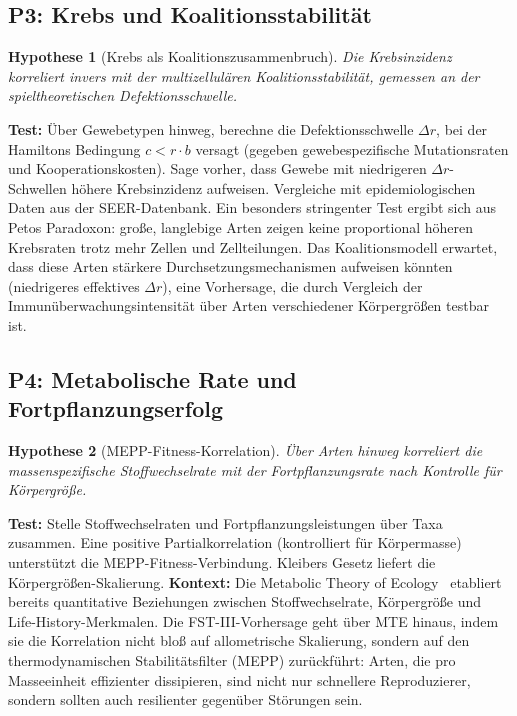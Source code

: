 \documentclass[12pt,a4paper]{article}
\newtheorem{hypothesis}{Hypothese}
\theoremstyle{remark}
\begin{document}
\subsection{P3: Krebs und Koalitionsstabilität}

\begin{hypothesis}[Krebs als Koalitionszusammenbruch]
Die Krebsinzidenz korreliert invers mit der multizellulären Koalitionsstabilität, gemessen an der spieltheoretischen Defektionsschwelle.
\end{hypothesis}

\textbf{Test:} Über Gewebetypen hinweg, berechne die Defektionsschwelle $\Delta r$, bei der Hamiltons Bedingung $c < r \cdot b$ versagt (gegeben gewebespezifische Mutationsraten und Kooperationskosten). Sage vorher, dass Gewebe mit niedrigeren $\Delta r$-Schwellen höhere Krebsinzidenz aufweisen. Vergleiche mit epidemiologischen Daten aus der SEER-Datenbank. Ein besonders stringenter Test ergibt sich aus Petos Paradoxon: große, langlebige Arten zeigen keine proportional höheren Krebsraten trotz mehr Zellen und Zellteilungen. Das Koalitionsmodell erwartet, dass diese Arten stärkere Durchsetzungsmechanismen aufweisen könnten (niedrigeres effektives $\Delta r$), eine Vorhersage, die durch Vergleich der Immunüberwachungsintensität über Arten verschiedener Körpergrößen testbar ist.

\subsection{P4: Metabolische Rate und Fortpflanzungserfolg}

\begin{hypothesis}[MEPP-Fitness-Korrelation]
Über Arten hinweg korreliert die massenspezifische Stoffwechselrate mit der Fortpflanzungsrate nach Kontrolle für Körpergröße.
\end{hypothesis}

\textbf{Test:} Stelle Stoffwechselraten und Fortpflanzungsleistungen über Taxa zusammen. Eine positive Partialkorrelation (kontrolliert für Körpermasse) unterstützt die MEPP-Fitness-Verbindung. Kleibers Gesetz liefert die Körpergrößen-Skalierung. \textbf{Kontext:} Die Metabolic Theory of Ecology~\citep{BrownMTE2004} etabliert bereits quantitative Beziehungen zwischen Stoffwechselrate, Körpergröße und Life-History-Merkmalen. Die FST-III-Vorhersage geht über MTE hinaus, indem sie die Korrelation nicht bloß auf allometrische Skalierung, sondern auf den thermodynamischen Stabilitätsfilter (MEPP) zurückführt: Arten, die pro Masseeinheit effizienter dissipieren, sind nicht nur schnellere Reproduzierer, sondern sollten auch resilienter gegenüber Störungen sein.
\end{document}
